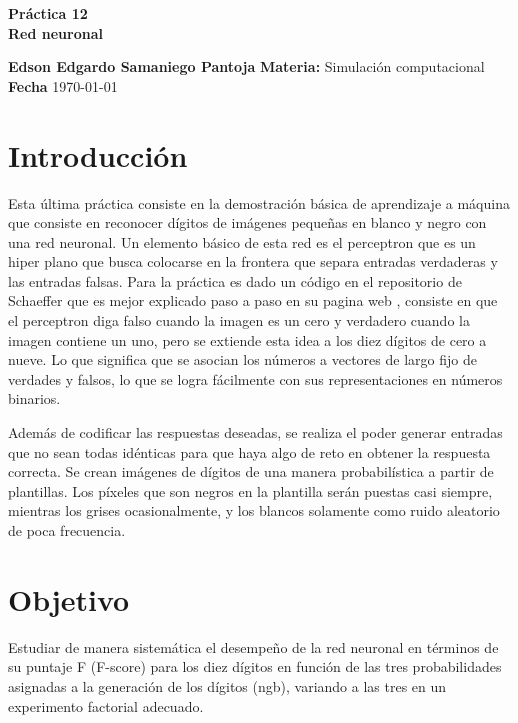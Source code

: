 \documentclass[a4paper, 11pt]{article}
\begin{document}
\begin{center}
\LARGE \bf Pr\'actica 12\\ Red neuronal
\end{center}

\vspace{1cm} 
\noindent\textbf {Edson Edgardo Samaniego Pantoja} \hfill \textbf{Materia:} Simulación computacional 
\hfill \\
\textbf{Fecha} \today  
\vspace{1cm} 

\section{Introducción}
Esta última práctica consiste en la demostración básica de aprendizaje a máquina que consiste en reconocer dígitos de imágenes pequeñas en blanco y negro con una red neuronal.
Un elemento básico de esta red es el perceptron que es un hiper plano que busca
colocarse en la frontera que separa entradas verdaderas y las entradas falsas.
Para la práctica es dado un código en el repositorio de Schaeffer \cite{elisa} que es mejor explicado paso a paso en su pagina web \cite{dra}, consiste en que el perceptron diga falso cuando la imagen es un cero y verdadero cuando la imagen contiene un uno, pero se extiende esta idea a los diez dígitos de cero a nueve. Lo que significa que se asocian los números a vectores de largo fijo de verdades y falsos, lo que se logra fácilmente con sus representaciones en números binarios.

Además de codificar las respuestas deseadas, se realiza el poder generar entradas que no sean todas idénticas para que haya algo de reto en obtener la respuesta correcta. Se crean imágenes de dígitos de una manera probabilística a partir de plantillas. Los píxeles que son negros en la plantilla serán puestas casi siempre, mientras los grises ocasionalmente, y los blancos solamente como ruido aleatorio de poca frecuencia.

\section{Objetivo}
Estudiar de manera sistemática el desempeño de la red neuronal en términos de su puntaje F (F-score) para los diez dígitos en función de las tres probabilidades asignadas a la generación de los dígitos (ngb), variando a las tres en un experimento factorial adecuado.
\end{document}

